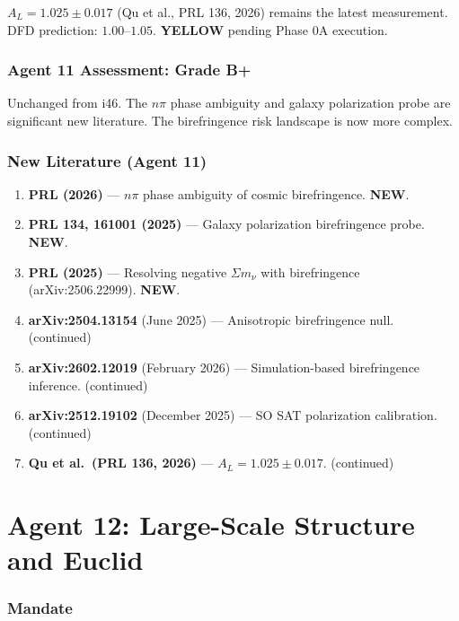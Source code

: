 \documentclass[11pt,a4paper]{article}
\newcommand{\YELLOW}{\textcolor{dfdyellow}{\textbf{YELLOW}}}
\newcommand{\NEW}{\textcolor{dfdblue}{\textbf{NEW}}}
\begin{document}
$A_L = 1.025 \pm 0.017$ (Qu et al., PRL 136, 2026) remains the latest measurement. DFD prediction: $1.00$--$1.05$. \YELLOW{} pending Phase 0A execution.

\section{Agent 11 Assessment: Grade B+}

Unchanged from i46. The $n\pi$ phase ambiguity and galaxy polarization probe are significant new literature. The birefringence risk landscape is now more complex.

\section{New Literature (Agent 11)}

\begin{enumerate}
\item \textbf{PRL (2026)} --- $n\pi$ phase ambiguity of cosmic birefringence. \NEW.
\item \textbf{PRL 134, 161001 (2025)} --- Galaxy polarization birefringence probe. \NEW.
\item \textbf{PRL (2025)} --- Resolving negative $\Sigma m_\nu$ with birefringence (arXiv:2506.22999). \NEW.
\item \textbf{arXiv:2504.13154} (June 2025) --- Anisotropic birefringence null. (continued)
\item \textbf{arXiv:2602.12019} (February 2026) --- Simulation-based birefringence inference. (continued)
\item \textbf{arXiv:2512.19102} (December 2025) --- SO SAT polarization calibration. (continued)
\item \textbf{Qu et al.\ (PRL 136, 2026)} --- $A_L = 1.025 \pm 0.017$. (continued)
\end{enumerate}


\part{Agent 12: Large-Scale Structure and Euclid}
\label{part:agent12}

\section{Mandate}
\end{document}
